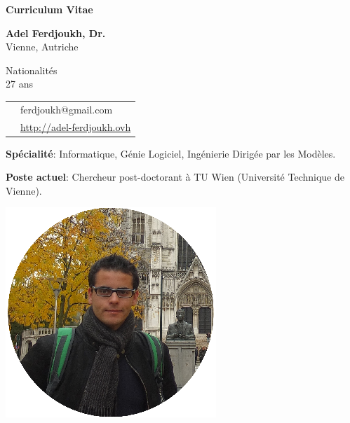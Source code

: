 \thispagestyle{empty}

\renewcommand\refname{~}

\begin{center}
\par\textbf{\huge Curriculum Vitae}
\end{center}

\vspace{.5cm}

\begin{minipage}{0.45\textwidth}
\textbf{Adel Ferdjoukh, Dr.} \\ 
Vienne, Autriche

\vspace{.3cm}

Nationalités \fr{} \dz{} \kab{} \\
27 ans \\

\begin{tabular}{cl}
\email{} & ferdjoukh@gmail.com\\

\web{} & \url{http://adel-ferdjoukh.ovh}\\
\end{tabular}

\medskip
{\bf Spécialité}: Informatique, Génie Logiciel, Ingénierie Dirigée par les Modèles.

\medskip
{\bf Poste actuel}: Chercheur post-doctorant à TU Wien (Université Technique de Vienne).


\end{minipage}
\hfill
\begin{minipage}{0.45\textwidth}
\begin{flushright}
\includegraphics[scale=0.25]{img/me2.png}~~~~~~~~
\end{flushright}
\end{minipage}


\tair

\sectionline{}
